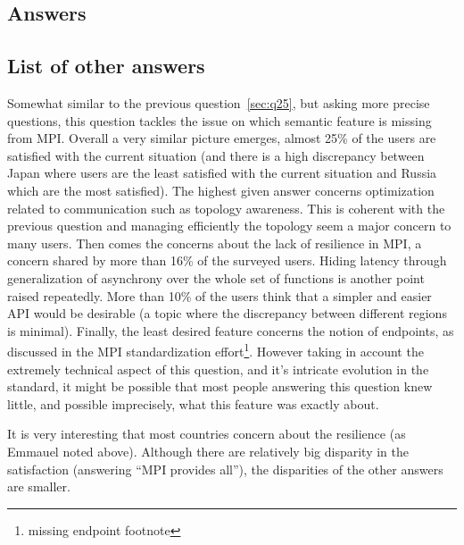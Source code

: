
\subsection{Answers}


\subsection{List of other answers}
\begin{itemize}

\end{itemize}

Somewhat similar to the previous question~\ref{sec:q25}, but asking more precise
questions, this question tackles the issue on which semantic feature is missing
from MPI. Overall a very similar picture emerges, almost 25\% of the users are
satisfied with the current situation (and there is a high discrepancy between
Japan where users are the least satisfied with the current situation and Russia
which are the most satisfied).
The highest given answer concerns optimization related to communication such as
topology awareness. This is coherent with the previous question and managing
efficiently the topology seem a major concern to many users. Then comes the
concerns about the lack of resilience in MPI, a concern shared by more than 16\%
of the surveyed users. Hiding latency through generalization of asynchrony over
the whole set of functions is another point raised repeatedly. More than 10\% of
the users think that a simpler and easier API would be desirable (a topic where
the discrepancy between different regions is minimal).
%
%
Finally, the least desired feature concerns the notion of endpoints, as
discussed in the MPI standardization effort\footnote{missing endpoint footnote}.
However taking in account the extremely technical aspect of this question, and
it's intricate evolution in the standard, it might be possible that most people
answering this question knew little, and possible imprecisely, what this feature
was exactly about.

It is very interesting that most countries concern about the
resilience (as Emmauel noted above). Although there are relatively big
disparity in the satisfaction (answering ``MPI provides all''), the
disparities of the other answers are smaller.

